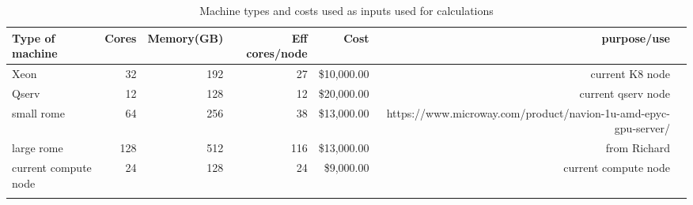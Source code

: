 \tiny \begin{longtable} { |p{}  |r  |r  |r  |r  |r  |r |} 
\caption{Machine types and costs used as inputs used for calculations \label{tab:Machines}}\\ 
\hline 
\textbf{Type of machine }&\textbf{Cores}&\textbf{Memory(GB)}&\textbf{Eff cores/node}&\textbf{Cost}&\textbf{purpose/use } \\ \hline
{Xeon }&{32}&{192}&{27}&{\$10,000.00}&{current K8 node } \\ \hline
{Qserv }&{12}&{128}&{12}&{\$20,000.00}&{current qserv node } \\ \hline
{small rome  }&{64}&{256}&{38}&{\$13,000.00}&{https://www.microway.com/product/navion-1u-amd-epyc-gpu-server/} \\ \hline
{large rome }&{128}&{512}&{116}&{\$13,000.00}&{from Richard} \\ \hline
{current compute node }&{24}&{128}&{24}&{\$9,000.00}&{current compute node} \\ \hline
{}&{}&{}&{}&{}&{} \\ \hline
\end{longtable} \normalsize
